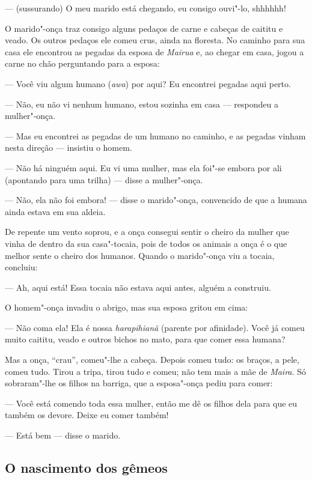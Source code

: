 --- (sussurando) O meu marido está chegando, eu consigo ouvi"-lo, shhhhhh!

O marido"-onça traz consigo alguns pedaços de carne e cabeças de caititu
e veado. Os outros pedaços ele comeu crus, ainda na floresta. No caminho
para sua casa ele encontrou as pegadas da esposa de \emph{Mairua} e, ao
chegar em casa, jogou a carne no chão perguntando para a esposa:

--- Você viu algum humano (\emph{awa}) por aqui? Eu encontrei pegadas aqui
perto.

--- Não, eu não vi nenhum humano, estou sozinha em casa --- respondeu a
mulher"-onça.

--- Mas eu encontrei as pegadas de um humano no caminho, e as pegadas
vinham nesta direção --- insistiu o homem.

--- Não há ninguém aqui. Eu vi uma mulher, mas ela foi"-se embora por ali
(apontando para uma trilha) --- disse a mulher"-onça.

--- Não, ela não foi embora! --- disse o marido"-onça, convencido de que a
humana ainda estava em sua aldeia.

De repente um vento soprou, e a onça consegui sentir o cheiro da mulher
que vinha de dentro da sua casa"-tocaia, pois de todos os animais a onça
é o que melhor sente o cheiro dos humanos. Quando o marido"-onça viu a
tocaia, concluiu:

--- Ah, aqui está! Essa tocaia não estava aqui antes, alguém a construiu.

O homem"-onça invadiu o abrigo, mas sua esposa gritou em cima:

--- Não coma ela! Ela é nossa \emph{harapihianã} (parente por afinidade).
Você já comeu muito caititu, veado e outros bichos no mato, para que
comer essa humana?

Mas a onça, ``crau'', comeu"-lhe a cabeça. Depois comeu tudo: os braços, a
pele, comeu tudo. Tirou a tripa, tirou tudo e comeu; não tem mais a mãe
de \emph{Maira}. Só sobraram"-lhe os filhos na barriga, que a esposa"-onça
pediu para comer:

--- Você está comendo toda essa mulher, então me dê os filhos dela para
que eu também os devore. Deixe eu comer também!

--- Está bem --- disse o marido.

\subsection{O nascimento dos gêmeos}

